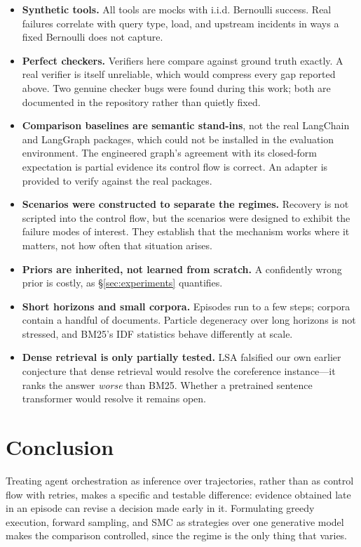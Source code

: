 \documentclass[11pt,a4paper]{article}
\begin{document}
\begin{itemize}[leftmargin=1.4em,itemsep=0.3em]
\item \textbf{Synthetic tools.} All tools are mocks with i.i.d. Bernoulli
      success. Real failures correlate with query type, load, and upstream
      incidents in ways a fixed Bernoulli does not capture.
\item \textbf{Perfect checkers.} Verifiers here compare against ground truth
      exactly. A real verifier is itself unreliable, which would compress every
      gap reported above. Two genuine checker bugs were found during this work;
      both are documented in the repository rather than quietly fixed.
\item \textbf{Comparison baselines are semantic stand-ins}, not the real
      LangChain and LangGraph packages, which could not be installed in the
      evaluation environment. The engineered graph's agreement with its
      closed-form expectation is partial evidence its control flow is correct.
      An adapter is provided to verify against the real packages.
\item \textbf{Scenarios were constructed to separate the regimes.} Recovery is
      not scripted into the control flow, but the scenarios were designed to
      exhibit the failure modes of interest. They establish that the mechanism
      works where it matters, not how often that situation arises.
\item \textbf{Priors are inherited, not learned from scratch.} A confidently
      wrong prior is costly, as \S\ref{sec:experiments} quantifies.
\item \textbf{Short horizons and small corpora.} Episodes run to a few steps;
      corpora contain a handful of documents. Particle degeneracy over long
      horizons is not stressed, and BM25's IDF statistics behave differently at
      scale.
\item \textbf{Dense retrieval is only partially tested.} LSA falsified our own
      earlier conjecture that dense retrieval would resolve the coreference
      instance---it ranks the answer \emph{worse} than BM25. Whether a
      pretrained sentence transformer would resolve it remains open.
\end{itemize}

\section{Conclusion}

Treating agent orchestration as inference over trajectories, rather than as
control flow with retries, makes a specific and testable difference: evidence
obtained late in an episode can revise a decision made early in it. Formulating
greedy execution, forward sampling, and SMC as strategies over one generative
model makes the comparison controlled, since the regime is the only thing that
varies.
\end{document}

